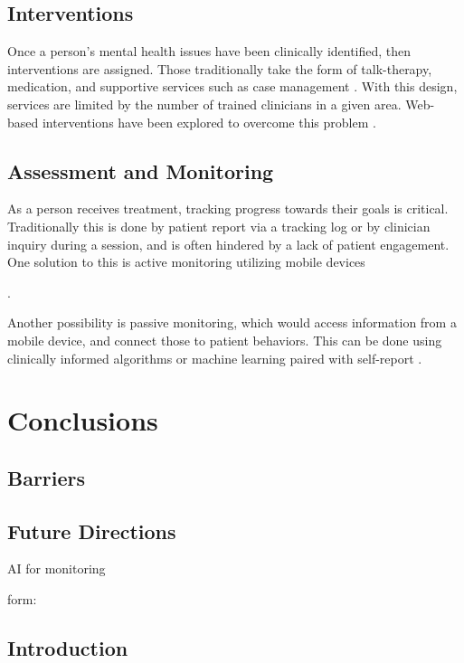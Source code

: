 \documentclass[sigconf]{acmart}
\begin{document}
\subsection{Interventions}
Once a person's mental health issues have been clinically identified, then interventions are assigned. Those traditionally take the form of talk-therapy, medication, and supportive services such as case management \cite{samhsatx}. With this design, services are limited by the number of trained clinicians in a given area. Web-based interventions have been explored to overcome this problem \cite{bitreview}.
\subsection{Assessment and Monitoring}
As a person receives treatment, tracking progress towards their goals is critical. Traditionally this is done by patient report via a tracking log or by clinician inquiry during a session, and is often hindered by a lack of patient engagement. One solution to this is active monitoring utilizing mobile devices \cite{bitreview} 

\cite{bigdatabipolar}.

Another possibility is passive monitoring, which would access information from a mobile device, and connect those to patient behaviors. This can be done using clinically informed algorithms or machine learning paired with self-report \cite{bitreview} \cite{bigdatabipolar}. 






\section{Conclusions}

\subsection{Barriers}

\subsection{Future Directions}
AI for monitoring

\appendix

form:

\subsection{Introduction}
\end{document}
